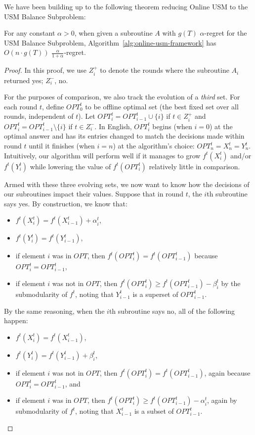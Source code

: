 \documentclass[final,12pt]{colt2018}
\newcommand{\BalanceSubproblem}{USM Balance Subproblem}
\newcommand{\OnlineUSM}{Online USM}
\newcommand{\Yes}[1][i]{Z^+_{#1}}
\newcommand{\No}[1][i]{Z^-_{#1}}
\begin{document}
We have been building up to the following theorem reducing \OnlineUSM{} to the \BalanceSubproblem{}:
\begin{theorem}\label{thm:balance-subproblem}
  For any constant $\alpha > 0$, when given a subroutine $A$ with $g(T)$ $\alpha$-regret for the \BalanceSubproblem{}, Algorithm~\ref{alg:online-usm-framework} has $O(n \cdot g(T))$ $\frac{\alpha}{1+\alpha}$-regret.
\end{theorem}

\begin{proof}
  In this proof, we use $\Yes$ to denote the rounds where the subroutine $A_i$ returned yes; $\No$, no.
  
  For the purposes of comparison, we also track the evolution of a \emph{third} set. For each round $t$, define $OPT^t_0$ to be offline optimal set (the best fixed set over all rounds, independent of $t$). Let $OPT^t_i = OPT^t_{i-1} \cup \{i\}$ if $t \in \Yes$ and $OPT^t_i = OPT^t_{i-1} \setminus \{i\}$ if $t \in \No$.  In English, $OPT^t_i$ begins (when $i=0$) at the optimal answer and has its entries changed to match the decisions made within round $t$ until it finishes (when $i = n$) at the algorithm's choice: $OPT^t_n = X^t_n = Y^t_n$. Intuitively, our algorithm will perform well if it manages to grow $f^t(X^t_i)$ and/or $f^t(Y^t_i)$ while lowering the value of $f^t(OPT^t_i)$ relatively little in comparison.

  Armed with these three evolving sets, we now want to know how the decisions of our subroutines impact their values. Suppose that in round $t$, the $i$th subroutine says yes. By construction, we know that:
  \begin{itemize}
    \item $f^t(X^t_i) = f^t(X^t_{i-1}) + \alpha^t_i$,
    \item $f^t(Y^t_i) = f^t(Y^t_{i-1})$,
    \item if element $i$ was in $OPT$, then $f^t(OPT^t_i) = f^t(OPT^t_{i-1})$ because $OPT^t_i = OPT^t_{i-1}$,
    \item if element $i$ was not in $OPT$, then $f^t(OPT^t_i) \ge f^t(OPT^t_{i-1}) - \beta^t_i$ by the submodularity of $f^t$, noting that $Y^t_{i-1}$ is a superset of $OPT^t_{i-1}$.
  \end{itemize}
  By the same reasoning, when the $i$th subroutine says no, all of the following happen:
  \begin{itemize}
    \item $f^t(X^t_i) = f^t(X^t_{i-1})$,
    \item $f^t(Y^t_i) = f^t(Y^t_{i-1}) + \beta^t_i$,
    \item if element $i$ was not in $OPT$, then $f^t(OPT^t_i) = f^t(OPT^t_{i-1})$, again because $OPT^t_i = OPT^t_{i-1}$, and
    \item if element $i$ was in $OPT$, then $f^t(OPT^t_i) \ge f^t(OPT^t_{i-1}) - \alpha^t_i$, again by submodularity of $f^t$, noting that $X^t_{i-1}$ is a subset of $OPT^t_{i-1}$.
  \end{itemize}
  

\end{proof}
\end{document}
